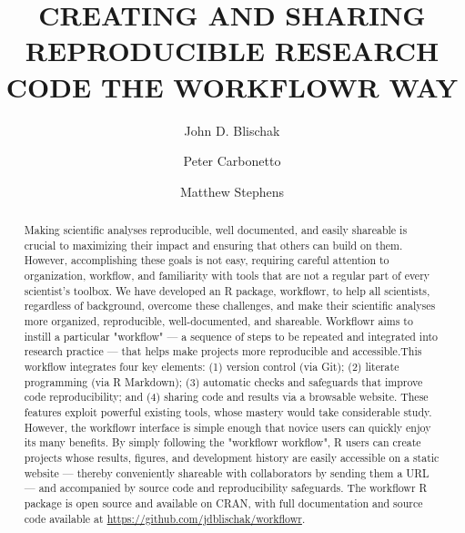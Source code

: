 \documentclass[9pt,a4paper]{extarticle}
\begin{document}
\pagestyle{front}

\title{CREATING AND SHARING REPRODUCIBLE RESEARCH CODE THE WORKFLOWR
WAY}

\author[1]{John D. Blischak}

\author[1,2]{Peter Carbonetto}

\author[1,3]{Matthew Stephens}




\maketitle

\thispagestyle{front}

\begin{abstract}


Making scientific analyses reproducible, well documented, and easily
shareable is crucial to maximizing their impact and ensuring that others
can build on them. However, accomplishing these goals is not easy,
requiring careful attention to organization, workflow, and familiarity
with tools that are not a regular part of every scientist's toolbox. We
have developed an R package, workflowr, to help all scientists,
regardless of background, overcome these challenges, and make their
scientific analyses more organized, reproducible, well-documented, and
shareable. Workflowr aims to instill a particular "workflow" --- a
sequence of steps to be repeated and integrated into research practice
--- that helps make projects more reproducible and accessible.This
workflow integrates four key elements: (1) version control (via Git);
(2) literate programming (via R Markdown); (3) automatic checks and
safeguards that improve code reproducibility; and (4) sharing code and
results via a browsable website. These features exploit powerful
existing tools, whose mastery would take considerable study. However,
the workflowr interface is simple enough that novice users can quickly
enjoy its many benefits. By simply following the "workflowr workflow", R
users can create projects whose results, figures, and development
history are easily accessible on a static website --- thereby
conveniently shareable with collaborators by sending them a URL --- and
accompanied by source code and reproducibility safeguards. The workflowr
R package is open source and available on CRAN, with full documentation
and source code available at
\url{https://github.com/jdblischak/workflowr}.

\end{abstract}
\end{document}
